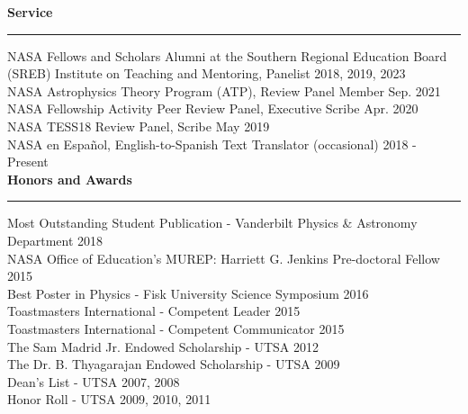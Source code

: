 \documentclass[12pt]{article}
\begin{document}
\noindent
{\bf Service} \\
\vspace{-10mm}
\begin{center}
\rule{\textwidth}{0.2mm}
\end{center}
\vspace{-3mm}
\noindent
NASA Fellows and Scholars Alumni at the Southern Regional Education Board (SREB) Institute on Teaching and Mentoring, Panelist \hfill 2018, 2019, 2023 \\
NASA Astrophysics Theory Program (ATP), Review Panel Member \hfill Sep. 2021 \\
NASA Fellowship Activity Peer Review Panel, Executive Scribe \hfill Apr. 2020 \\
NASA TESS18 Review Panel, Scribe \hfill May 2019 \\
NASA en Español, English-to-Spanish Text Translator (occasional) \hfill 2018 - Present \\





\noindent
{\bf Honors and Awards} \\
\vspace{-10mm}
\begin{center}
\rule{\textwidth}{0.2mm}
\end{center}
\vspace{-3mm}
\noindent
Most Outstanding Student Publication - Vanderbilt Physics \& Astronomy Department \hfill 2018 \\
NASA Office of Education's MUREP: Harriett G. Jenkins Pre-doctoral Fellow \hfill 2015 \\
Best Poster in Physics - Fisk University Science Symposium \hfill 2016 \\
Toastmasters International - Competent Leader \hfill 2015 \\
Toastmasters International - Competent Communicator \hfill 2015 \\
The Sam Madrid Jr. Endowed Scholarship - UTSA \hfill 2012 \\
The Dr. B. Thyagarajan Endowed Scholarship - UTSA \hfill 2009 \\
Dean’s List - UTSA \hfill 2007, 2008 \\
Honor Roll - UTSA \hfill 2009, 2010, 2011 \\
\end{document}
